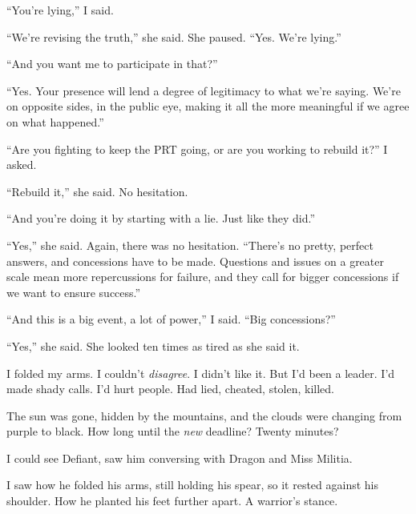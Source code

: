 ``You're lying,'' I said.



``We're revising the truth,'' she said.  She paused.  ``Yes.  We're lying.''



``And you want me to participate in that?''



``Yes.  Your presence will lend a degree of legitimacy to what we're saying.  We're on opposite sides, in the public eye, making it all the more meaningful if we agree on what happened.''



``Are you fighting to keep the PRT going, or are you working to rebuild it?'' I asked.



``Rebuild it,'' she said.  No hesitation.



``And you're doing it by starting with a lie.  Just like they did.''



``Yes,'' she said.  Again, there was no hesitation.  ``There's no pretty, perfect answers, and concessions have to be made.  Questions and issues on a greater scale mean more repercussions for failure, and they call for bigger concessions if we want to ensure success.''



``And this is a big event, a lot of power,'' I said.  ``Big concessions?''



``Yes,'' she said.  She looked ten times as tired as she said it.



I folded my arms.  I couldn't \emph{disagree}.  I didn't like it.  But I'd been a leader.  I'd made shady calls.  I'd hurt people.  Had lied, cheated, stolen, killed.



The sun was gone, hidden by the mountains, and the clouds were changing from purple to black.  How long until the \emph{new} deadline?  Twenty minutes?



I could see Defiant, saw him conversing with Dragon and Miss Militia.



I saw how he folded his arms, still holding his spear, so it rested against his shoulder.  How he planted his feet further apart.  A warrior's stance.



